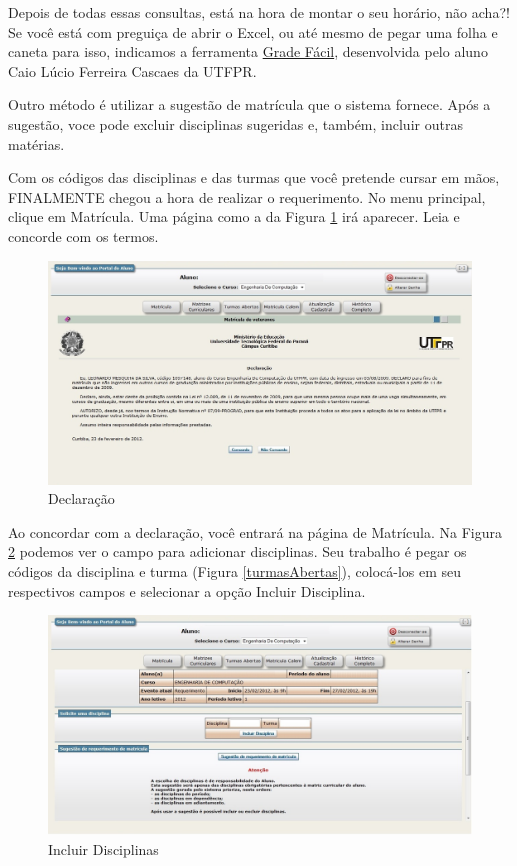 \documentclass[a4paper,12pt,openany]{article}
\begin{document}
Depois de todas essas consultas, está na hora de montar o seu horário, não acha?! Se você está com preguiça de abrir o Excel, ou até mesmo de pegar uma folha e caneta para isso, indicamos a ferramenta \href{http://www.caiux.net/utfpr/}{Grade Fácil}, desenvolvida pelo aluno Caio Lúcio Ferreira Cascaes  da UTFPR.

Outro método é utilizar a sugestão de matrícula que o sistema fornece. Após a sugestão, voce pode excluir disciplinas sugeridas e, também, incluir outras matérias.

Com os códigos das disciplinas e das turmas que você pretende cursar em mãos, FINALMENTE chegou a hora de realizar o requerimento. No menu principal, clique em Matrícula. Uma página como a da Figura \ref{matriculaTermos} irá aparecer. Leia e concorde com os termos.

	\begin{figure}[ht!]  \centering
		\includegraphics[scale=0.5]{mat5.jpg}
		\caption{Declaração}
		\label{matriculaTermos}
	\end{figure}

Ao concordar com a declaração, você entrará na página de Matrícula. Na Figura \ref{inicioMatricula} podemos ver o campo para adicionar disciplinas. Seu trabalho é pegar os códigos da disciplina e turma (Figura \ref{turmasAbertas}), colocá-los em seu respectivos campos e selecionar a opção Incluir Disciplina. 

	\begin{figure}[ht!]  \centering
		\includegraphics[scale=0.45]{mat7.jpg}
		\caption{Incluir Disciplinas}
		\label{inicioMatricula}
	\end{figure}
\end{document}
